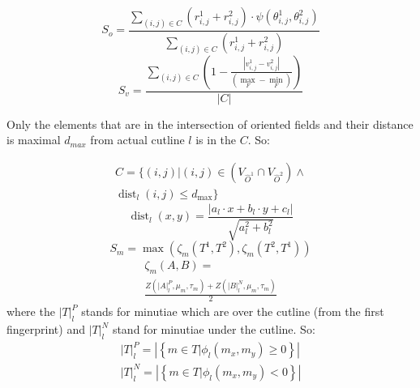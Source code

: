 \begin{equation}
    S_{o}=\frac{\sum_{(i, j) \in C}\left(r_{i, j}^{1}+r_{i, j}^{2}\right) \cdot \psi\left(\theta_{i, j}^{1}, \theta_{i, j}^{2}\right)}{\sum_{(i, j) \in C}\left(r_{i, j}^{1}+r_{i, j}^{2}\right)}
\end{equation}
\begin{equation}
    S_{v}=\frac{\sum_{(i, j) \in C}\left(1-\frac{\left|v_{i, j}^{1}-v_{i, j}^{2}\right|}{\left(\max _{F}-\min _{F}\right)}\right)}{|C|}
\end{equation}

Only the elements that are in the intersection of oriented fields and their distance is maximal $d_{max}$ from actual cutline $l$ is in the $C$. So:

\begin{equation}
  \begin{split}
      C=\{(i, j) |(i, j) \in\left(V_{\hat{O}^{1}} \cap V_{\hat{O}^{2}}\right) \wedge \\\operatorname{dist}_{l}(i, j) \leq d_{\max }\}
  \end{split}
 \end{equation}
 \begin{equation}
     \operatorname{dist}_{l}(x, y)=\frac{\left|a_{l} \cdot x+b_{l} \cdot y+c_{l}\right|}{\sqrt{a_{l}^{2}+b_{l}^{2}}}
 \end{equation}
 \begin{equation}
     S_{m}=\max \left(\zeta_{m}\left(T^{1}, T^{2}\right), \zeta_{m}\left(T^{2}, T^{1}\right)\right)
 \end{equation}
 \begin{equation}
 \begin{split}
     \zeta_{m}(A, B)=\\\frac{Z\left(|A|_{l}^{P}, \mu_{m}, \tau_{m}\right)+Z\left(|B|_{l}^{N}, \mu_{m}, \tau_{m}\right)}{2}
 \end{split}
 \end{equation}
 where the $|T|_{l}^{P}$ stands for minutiae which are over the cutline (from the first fingerprint) and $|T|_{l}^{N}$ stand for minutiae under the cutline. So:
 \begin{equation}
     \begin{array}{l}
        |T|_{l}^{P}=\left|\left\{m \in T | \phi_{l}\left(m_{x}, m_{y}\right) \geq 0\right\}\right| \\
        |T|_{l}^{N}=\left|\left\{m \in T | \phi_{l}\left(m_{x}, m_{y}\right)<0\right\}\right|
    \end{array}
 \end{equation}\cite{morphing_paper}

